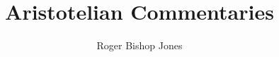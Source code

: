 


\usepackage[toc,nonumberlist,style=altlist]{glossaries}
\usepackage[mathletters]{ucs}
\usepackage[utf8x]{inputenc}

\usepackage{fancyhdr}
\pagestyle{fancyplain}


\makeatletter
\def\cleardoublepage{\clearpage\if@twoside \ifodd\c@page\else
\hbox{}
\vspace*{\fill}
\begin{center}\end{center}
\vspace{\fill}
\thispagestyle{empty}
\newpage
\if@twocolumn\hbox{}\newpage\fi\fi\fi}
\makeatother

\fancyhfoffset[EL,RO]{0pt}
\lhead[\fancyplain{}{\thepage}]         {\fancyplain{}{}}
\chead[\fancyplain{}{\slshape\leftmark}]                 {\fancyplain{}{\slshape\rightmark}}
\rhead[\fancyplain{}{}]       {\fancyplain{}{\thepage}}
\lfoot[\fancyplain{}{}]       {\fancyplain{}{}}
\cfoot[\fancyplain{}{}]       {\fancyplain{}{}}
\rfoot[\fancyplain{}{}]       {\fancyplain{}{}}

\renewcommand{\headrulewidth}{0pt}

\usepackage[twoside,paperwidth=5.25in,paperheight=8in,hmargin={0.75in,0.5in},vmargin={0.5in,0.5in},includehead,includefoot]{geometry}
\usepackage{tocloft}
\usepackage{tocbibind}

\makeglossaries
\makeindex

\newcommand{\indexentry}[2]{\item #1 #2}

\newcommand{\ignore}[1]{}

\title{Aristotelian Commentaries}
\author{Roger Bishop Jones}
\date{\ }




